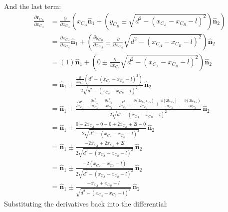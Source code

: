 \documentclass[titlepage]{article}
\begin{document}
And the last term:
\begin{equation}
	\begin{split}
		\frac{\partial\boldsymbol{r}_{C_A}}{\partial x_{C_A} }&=\frac{\partial}{\partial x_{C_A}}\left(x_{C_A}\hat{\boldsymbol{n}}_1+\left(y_{C_B}\pm\sqrt{d^2-(x_{C_A}-x_{C_B}-l)^2}\right)\hat{\boldsymbol{n}}_2\right) \\
		&=\frac{\partial x_{C_A}}{\partial x_{C_A}}\hat{\boldsymbol{n}}_1+\left(\frac{\partial y_{C_B}}{\partial x_{C_A}}\pm\frac{\partial}{\partial x_{C_A}}\sqrt{d^2-(x_{C_A}-x_{C_B}-l)^2}\right)\hat{\boldsymbol{n}}_2 \\
		&=(1)\hat{\boldsymbol{n}}_1+\left(0\pm\frac{\partial}{\partial x_{C_A}}\sqrt{d^2-(x_{C_A}-x_{C_B}-l)^2}\right)\hat{\boldsymbol{n}}_2 \\
		&=\hat{\boldsymbol{n}}_1\pm\frac{\frac{\partial }{\partial x_{C_A}}(d^2-(x_{C_A}-x_{C_B}-l)^2)}{2\sqrt{d^2-(x_{C_A}-x_{C_B}-l)^2}}\,\hat{\boldsymbol{n}}_2 \\
		&=\hat{\boldsymbol{n}}_1\pm\frac{\frac{\partial d^2}{\partial x_{C_A}}-\frac{\partial x_{C_A}^2}{\partial x_{C_A}}-\frac{\partial x_{C_B}^2}{\partial x_{C_A}}-\frac{\partial l^2}{\partial x_{C_A}}+\frac{\partial (2x_{C_A}x_{C_B})}{\partial x_{C_A}}+\frac{\partial (2lx_{C_A})}{\partial x_{C_A}}-\frac{\partial (2lx_{C_B})}{\partial x_{C_A}}}{2\sqrt{d^2-(x_{C_A}-x_{C_B}-l)^2}}\,\hat{\boldsymbol{n}}_2 \\
		&=\hat{\boldsymbol{n}}_1\pm\frac{0-2x_{C_A}-0-0+2x_{C_B}+2l-0}{2\sqrt{d^2-(x_{C_A}-x_{C_B}-l)^2}}\,\hat{\boldsymbol{n}}_2 \\
		&=\hat{\boldsymbol{n}}_1\pm\frac{-2x_{C_A}+2x_{C_B}+2l}{2\sqrt{d^2-(x_{C_A}-x_{C_B}-l)^2}}\,\hat{\boldsymbol{n}}_2 \\
		&=\hat{\boldsymbol{n}}_1\pm\frac{-2(x_{C_A}-x_{C_B}-l)}{2\sqrt{d^2-(x_{C_A}-x_{C_B}-l)^2}}\,\hat{\boldsymbol{n}}_2 \\
		&=\hat{\boldsymbol{n}}_1\pm\frac{-x_{C_A}+x_{C_B}+l}{\sqrt{d^2-(x_{C_A}-x_{C_B}-l)^2}}\,\hat{\boldsymbol{n}}_2
	\end{split}
\end{equation}
Substituting the derivatives back into the differential:
\small
\end{document}

